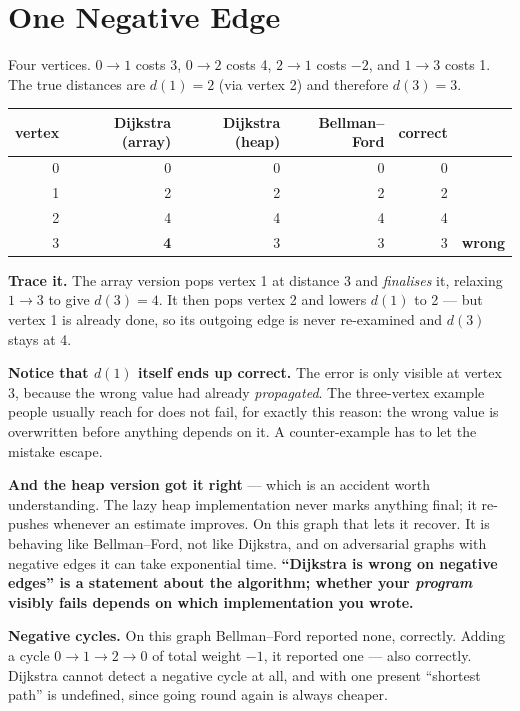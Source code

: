 \section{One Negative Edge}

\begin{worked}
Four vertices. $0 \to 1$ costs 3, $0 \to 2$ costs 4, $2 \to 1$ costs $-2$, and
$1 \to 3$ costs 1. The true distances are $d(1) = 2$ (via vertex 2) and
therefore $d(3) = 3$.

\begin{center}
\begin{tabular}{@{}rrrrrl@{}}
\toprule
\rowcolor{primary!15}
vertex & Dijkstra (array) & Dijkstra (heap) & Bellman--Ford & correct & \\
\midrule
0 & 0 & 0 & 0 & 0 & \\
1 & 2 & 2 & 2 & 2 & \\
2 & 4 & 4 & 4 & 4 & \\
3 & \textbf{4} & 3 & 3 & 3 & \textbf{wrong} \\
\bottomrule
\end{tabular}
\end{center}

\smallskip
\textbf{Trace it.} The array version pops vertex 1 at distance 3 and
\emph{finalises} it, relaxing $1 \to 3$ to give $d(3) = 4$. It then pops vertex
2 and lowers $d(1)$ to 2 --- but vertex 1 is already done, so its outgoing edge
is never re-examined and $d(3)$ stays at 4.

\smallskip
\textbf{Notice that $d(1)$ itself ends up correct.} The error is only visible
at vertex 3, because the wrong value had already \emph{propagated}. The
three-vertex example people usually reach for does not fail, for exactly this
reason: the wrong value is overwritten before anything depends on it. A
counter-example has to let the mistake escape.

\smallskip
\textbf{And the heap version got it right} --- which is an accident worth
understanding. The lazy heap implementation never marks anything final; it
re-pushes whenever an estimate improves. On this graph that lets it recover.
It is behaving like Bellman--Ford, not like Dijkstra, and on adversarial graphs
with negative edges it can take exponential time. \textbf{``Dijkstra is wrong
on negative edges'' is a statement about the algorithm; whether your
\emph{program} visibly fails depends on which implementation you wrote.}

\smallskip
\textbf{Negative cycles.} On this graph Bellman--Ford reported none, correctly.
Adding a cycle $0 \to 1 \to 2 \to 0$ of total weight $-1$, it reported one ---
also correctly. Dijkstra cannot detect a negative cycle at all, and with one
present ``shortest path'' is undefined, since going round again is always
cheaper.
\end{worked}

